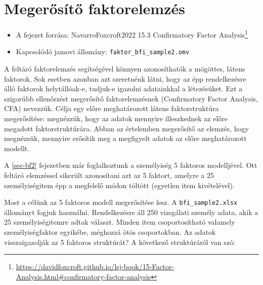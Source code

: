 \documentclass[
  letterpaper,
]{krantz}
\providecommand{\tightlist}{%
  \setlength{\itemsep}{0pt}\setlength{\parskip}{0pt}}\usepackage{longtable,booktabs,array}
\renewcommand{\href}[2]{#2\footnote{\url{#1}}}
\begin{document}

\hypertarget{sec-megerosito-faktorelemzes}{%
\chapter{Megerősítő faktorelemzés}\label{sec-megerosito-faktorelemzes}}

\begin{itemize}
\tightlist
\item
  A fejezet forrása: NavarroFoxcroft2022
  \href{https://davidfoxcroft.github.io/lsj-book/15-Factor-Analysis.html\#confirmatory-factor-analysis}{15.3
  Confirmatory Factor Analysis}
\item
  Kapcsolódó jamovi állomány: \texttt{faktor\_bfi\_sample2.omv}
\end{itemize}

A feltáró faktorelemzés segítségével könnyen azonosíthatók a mögöttes,
látens faktorok. Sok esetben azonban azt szeretnénk látni, hogy az épp
rendelkezésre álló faktorok helytállóak-e, tudjuk-e igazolni adatainkkal
a létezésüket. Ezt a szigorúbb ellenőrzést megerősítő faktorelemzésnek
(Confirmatory Factor Analysis, CFA) nevezzük. Célja egy előre
meghatározott látens faktorstruktúra megerősítése: megnézzük, hogy az
adatok mennyire illeszkednek az előre megadott faktorstruktúrára. Abban
az értelemben megerősítő az elemzés, hogy megnézzük, mennyire erősítik
meg a megfigyelt adatok az előre meghatározott modellt.

A \ref{sec-bf2} fejezetben már foglalkoztunk a személyiség 5 faktoros
modelljével. Ott feltáró elemzéssel sikerült azonosítani azt az 5
faktort, amelyre a 25 személyiségitem épp a megfelelő módon töltött
(egyetlen item kivételével).

Most a célünk az 5 faktoros modell megerősítése lesz. A
\texttt{bfi\_sample2.xlsx} állományt fogjuk használni. Rendelkezésre áll
250 vizsgálati személy adata, akik a 25 személyiségitemre adtak választ.
Minden item csoportosítható valamely személyiségfaktor egyikébe,
méghozzá ötös csoportokban. Az adatok visszaigazolják az 5 faktoros
struktúrát? A következő struktúráról van szó:
\end{document}

